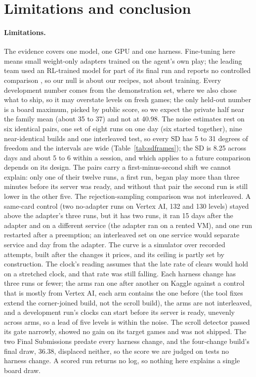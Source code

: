 \section{Limitations and conclusion}\label{sec:limits}

\paragraph{Limitations.}
The evidence covers one model, one GPU and one harness.
Fine-tuning here means small weight-only adapters trained on the agent's own play; the leading team used an RL-trained model for part of its final run and reports no controlled comparison \citep{chen2026forum755795}, so our null is about our recipes, not about training.
Every development number comes from the demonstration set, where we also chose what to ship, so it may overstate levels on fresh games; the only held-out number is a board maximum, picked by public score, so we expect the private half near the family mean (about 35 to 37) and not at 40.98. %
The noise estimates rest on six identical pairs, one set of eight runs on one day (six started together), nine near-identical builds and one interleaved test, so every SD has 5 to 31 degrees of freedom and the intervals are wide (Table~\ref{tab:sdframes}); the SD is 8.25 across days and about 5 to 6 within a session, and which applies to a future comparison depends on its design. The pairs carry a first-minus-second shift we cannot explain: only one of their twelve runs, a first run, began play more than three minutes before its server was ready, and without that pair the second run is still lower in the other five. %
The rejection-sampling comparison was not interleaved. A same-card control (two no-adapter runs on Vertex AI, 132 and 130 levels) stayed above the adapter's three runs, but it has two runs, it ran 15 days after the adapter and on a different service (the adapter ran on a rented VM), and one run restarted after a preemption; an interleaved set on one service would separate service and day from the adapter. %
The curve is a simulator over recorded attempts, built after the changes it prices, and its ceiling is partly set by construction. %
The clock's reading assumes that the late rate of clears would hold on a stretched clock, and that rate was still falling. %
Each harness change has three runs or fewer; the arms ran one after another on Kaggle against a control that is mostly from Vertex AI, each arm contains the one before (the tool fixes extend the corner-joined build, not the scroll build), the arms are not interleaved, and a development run's clocks can start before its server is ready, unevenly across arms, so a lead of five levels is within the noise. %
The scroll detector passed its gate narrowly, showed no gain on its target games and was not shipped. The two Final Submissions predate every harness change, and the four-change build's final draw, 36.38, displaced neither, so the score we are judged on tests no harness change. %
A scored run returns no log, so nothing here explains a single board draw.

